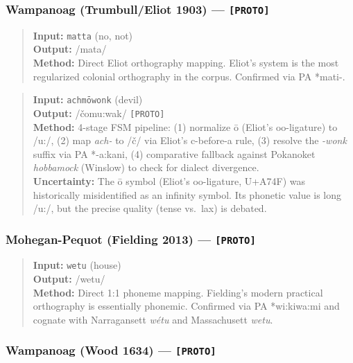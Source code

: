 \subsubsection*{Wampanoag (Trumbull/Eliot 1903) --- \texttt{[PROTO]}}

\begin{quote}
\textbf{Input:} \texttt{matta} (no, not) \\
\textbf{Output:} /mata/ \\
\textbf{Method:} Direct Eliot orthography mapping. Eliot's system is the most
regularized colonial orthography in the corpus. Confirmed via PA *mati-.
\end{quote}

\begin{quote}
\textbf{Input:} \texttt{achmōwonk} (devil) \\
\textbf{Output:} /čomu:wa\ng k/ \texttt{[PROTO]} \\
\textbf{Method:} 4-stage FSM pipeline: (1) normalize ō (Eliot's oo-ligature) to /u:/, (2) map
\textit{ach-} to /č/ via Eliot's c-before-a rule, (3) resolve the
\textit{-wonk} suffix via PA *-a:kani, (4) comparative fallback against
Pokanoket \textit{hobbamock} (Winslow) to check for dialect divergence. \\
\textbf{Uncertainty:} The ō symbol (Eliot's oo-ligature,
U+A74F) was historically misidentified as an infinity symbol. Its phonetic
value is long /u:/, but the precise quality (tense vs.\ lax) is debated.
\end{quote}

\subsubsection*{Mohegan-Pequot (Fielding 2013) --- \texttt{[PROTO]}}

\begin{quote}
\textbf{Input:} \texttt{wetu} (house) \\
\textbf{Output:} /wetu/ \\
\textbf{Method:} Direct 1:1 phoneme mapping. Fielding's modern practical
orthography is essentially phonemic. Confirmed via PA *wi:kiwa:mi and
cognate with Narragansett \textit{w\'etu} and Massachusett \textit{wetu}.
\end{quote}

\subsubsection*{Wampanoag (Wood 1634) --- \texttt{[PROTO]}}

